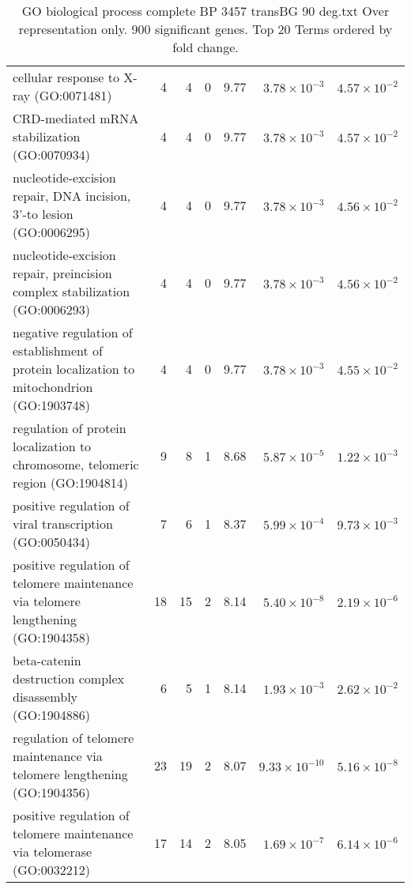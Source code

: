 \begin{table}[ht]
\begin{adjustbox}{width=\textwidth}
\begin{tabular}{lrrrlrr}
  cellular response to X-ray (GO:0071481) & 4 & 4 & 0 & 9.77 & $3.78 \times 10^{-3}$ & $4.57 \times 10^{-2}$ \\ 
  CRD-mediated mRNA stabilization (GO:0070934) & 4 & 4 & 0 & 9.77 & $3.78 \times 10^{-3}$ & $4.57 \times 10^{-2}$ \\ 
  nucleotide-excision repair, DNA incision, 3'-to lesion (GO:0006295) & 4 & 4 & 0 & 9.77 & $3.78 \times 10^{-3}$ & $4.56 \times 10^{-2}$ \\ 
  nucleotide-excision repair, preincision complex stabilization (GO:0006293) & 4 & 4 & 0 & 9.77 & $3.78 \times 10^{-3}$ & $4.56 \times 10^{-2}$ \\ 
  negative regulation of establishment of protein localization to mitochondrion (GO:1903748) & 4 & 4 & 0 & 9.77 & $3.78 \times 10^{-3}$ & $4.55 \times 10^{-2}$ \\ 
  regulation of protein localization to chromosome, telomeric region (GO:1904814) & 9 & 8 & 1 & 8.68 & $5.87 \times 10^{-5}$ & $1.22 \times 10^{-3}$ \\ 
  positive regulation of viral transcription (GO:0050434) & 7 & 6 & 1 & 8.37 & $5.99 \times 10^{-4}$ & $9.73 \times 10^{-3}$ \\ 
  positive regulation of telomere maintenance via telomere lengthening (GO:1904358) & 18 & 15 & 2 & 8.14 & $5.40 \times 10^{-8}$ & $2.19 \times 10^{-6}$ \\ 
  beta-catenin destruction complex disassembly (GO:1904886) & 6 & 5 & 1 & 8.14 & $1.93 \times 10^{-3}$ & $2.62 \times 10^{-2}$ \\ 
  regulation of telomere maintenance via telomere lengthening (GO:1904356) & 23 & 19 & 2 & 8.07 & $9.33 \times 10^{-10}$ & $5.16 \times 10^{-8}$ \\ 
  positive regulation of telomere maintenance via telomerase (GO:0032212) & 17 & 14 & 2 & 8.05 & $1.69 \times 10^{-7}$ & $6.14 \times 10^{-6}$ \\ 
   \hline
\end{tabular}
\end{adjustbox}
\caption{GO biological process complete BP 3457 transBG 90 deg.txt Over representation only. 900 significant genes. Top 20 Terms ordered by fold change. } 
\label{tab:GO biological process complete BP 3457 transBG 90 deg.txt Over representation only. 900 significant genes. Top 20 Terms ordered by fold change. }
\end{table}




